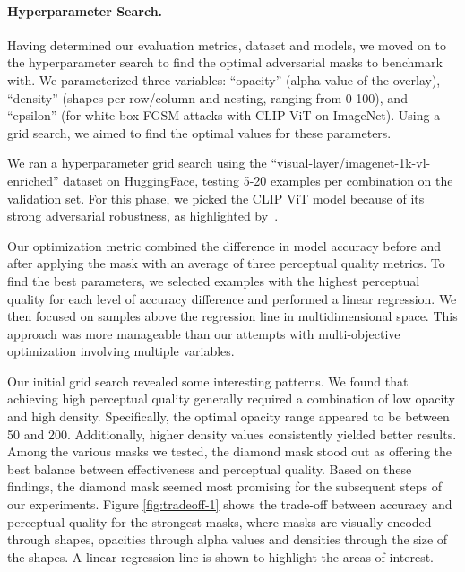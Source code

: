 \documentclass[a4paper, oneside]{discothesis}
\begin{document}
\paragraph{Hyperparameter Search.}

Having determined our evaluation metrics, dataset and models, we moved on to the hyperparameter search to find the optimal adversarial masks to benchmark with. We parameterized three variables: ``opacity'' (alpha value of the overlay), ``density'' (shapes per row/column and nesting, ranging from 0-100), and ``epsilon'' (for white-box FGSM attacks with CLIP-ViT on ImageNet). Using a grid search, we aimed to find the optimal values for these parameters.

We ran a hyperparameter grid search using the ``visual-layer/imagenet-1k-vl-enriched'' dataset on HuggingFace, testing 5-20 examples per combination on the validation set. For this phase, we picked the CLIP ViT model because of its strong adversarial robustness, as highlighted by~\cite{wang2024roz}.

Our optimization metric combined the difference in model accuracy before and after applying the mask with an average of three perceptual quality metrics. To find the best parameters, we selected examples with the highest perceptual quality for each level of accuracy difference and performed a linear regression. We then focused on samples above the regression line in multidimensional space. This approach was more manageable than our attempts with multi-objective optimization involving multiple variables.

Our initial grid search revealed some interesting patterns. We found that achieving high perceptual quality generally required a combination of low opacity and high density. Specifically, the optimal opacity range appeared to be between 50 and 200. Additionally, higher density values consistently yielded better results. Among the various masks we tested, the diamond mask stood out as offering the best balance between effectiveness and perceptual quality. Based on these findings, the diamond mask seemed most promising for the subsequent steps of our experiments. Figure \ref{fig:tradeoff-1} shows the trade-off between accuracy and perceptual quality for the strongest masks, where masks are visually encoded through shapes, opacities through alpha values and densities through the size of the shapes. A linear regression line is shown to highlight the areas of interest.
\end{document}
